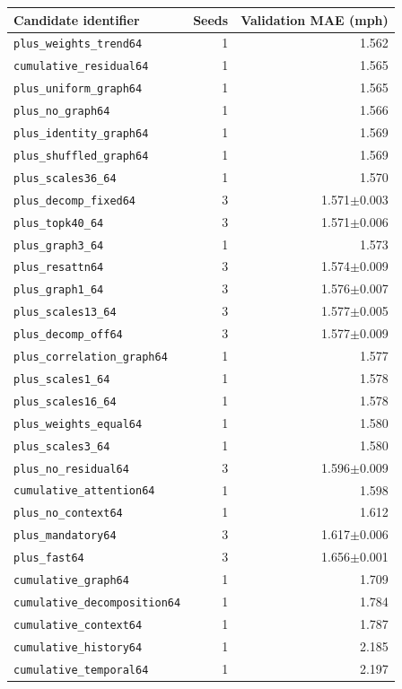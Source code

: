 \begin{tabular}{lrr}
\toprule
Candidate identifier & Seeds & Validation MAE (mph)\\
\midrule
\texttt{plus\_weights\_trend64} & 1 & 1.562\\
\texttt{cumulative\_residual64} & 1 & 1.565\\
\texttt{plus\_uniform\_graph64} & 1 & 1.565\\
\texttt{plus\_no\_graph64} & 1 & 1.566\\
\texttt{plus\_identity\_graph64} & 1 & 1.569\\
\texttt{plus\_shuffled\_graph64} & 1 & 1.569\\
\texttt{plus\_scales36\_64} & 1 & 1.570\\
\texttt{plus\_decomp\_fixed64} & 3 & 1.571$\pm$0.003\\
\texttt{plus\_topk40\_64} & 3 & 1.571$\pm$0.006\\
\texttt{plus\_graph3\_64} & 1 & 1.573\\
\texttt{plus\_resattn64} & 3 & 1.574$\pm$0.009\\
\texttt{plus\_graph1\_64} & 3 & 1.576$\pm$0.007\\
\texttt{plus\_scales13\_64} & 3 & 1.577$\pm$0.005\\
\texttt{plus\_decomp\_off64} & 3 & 1.577$\pm$0.009\\
\texttt{plus\_correlation\_graph64} & 1 & 1.577\\
\texttt{plus\_scales1\_64} & 1 & 1.578\\
\texttt{plus\_scales16\_64} & 1 & 1.578\\
\texttt{plus\_weights\_equal64} & 1 & 1.580\\
\texttt{plus\_scales3\_64} & 1 & 1.580\\
\texttt{plus\_no\_residual64} & 3 & 1.596$\pm$0.009\\
\texttt{cumulative\_attention64} & 1 & 1.598\\
\texttt{plus\_no\_context64} & 1 & 1.612\\
\texttt{plus\_mandatory64} & 3 & 1.617$\pm$0.006\\
\texttt{plus\_fast64} & 3 & 1.656$\pm$0.001\\
\texttt{cumulative\_graph64} & 1 & 1.709\\
\texttt{cumulative\_decomposition64} & 1 & 1.784\\
\texttt{cumulative\_context64} & 1 & 1.787\\
\texttt{cumulative\_history64} & 1 & 2.185\\
\texttt{cumulative\_temporal64} & 1 & 2.197\\
\bottomrule
\end{tabular}
